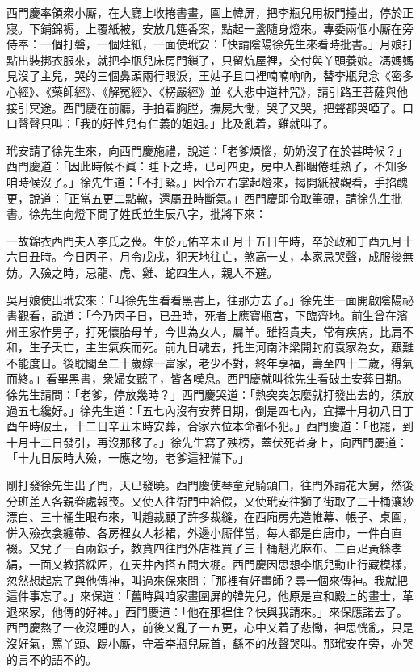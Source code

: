 西門慶率領衆小厮，在大廳上收捲書畫，圍上幃屏，把李瓶兒用板門擡出，停於正寢。下鋪錦褥，上覆紙被，安放几筵香案，點起一盞隨身燈來。專委兩個小厮在旁侍奉：一個打磐，一個炷紙，一面使玳安：「快請陰陽徐先生來看時批書。」月娘打點出裝挷衣服來，就把李瓶兒床房門鎖了，只留炕屋裡，交付與丫頭養娘。馮媽媽見沒了主兒，哭的三個鼻頭兩行眼淚，王姑子且口裡喃喃吶吶，{}替李瓶兒念《密多心經》、《藥師經》、《解冤經》、《楞嚴經》並《大悲中道神咒》，請引路王菩薩與他接引冥途。西門慶在前廳，手拍着胸膛，撫屍大慟，哭了又哭，把聲都哭啞了。口口聲聲只叫：「我的好性兒有仁義的姐姐。」比及亂着，雞就叫了。

玳安請了徐先生來，向西門慶施禮，說道：「老爹煩惱，奶奶沒了在於甚時候？」西門慶道：「因此時候不眞：睡下之時，已可四更，房中人都睏倦睡熟了，不知多咱時候沒了。」徐先生道：「不打緊。」因令左右掌起燈來，揭開紙被觀看，手掐醜更，說道：「正當五更二點轍，還屬丑時斷氣。」西門慶即令取筆硯，請徐先生批書。徐先生向燈下問了姓氏並生辰八字，批將下來：

\begin{myquote}[\markfont]
一故錦衣西門夫人李氏之䘮。生於元佑辛未正月十五日午時，卒於政和丁酉九月十六日丑時。今日丙子，月令戊戌，犯天地往亡，煞高一丈，本家忌哭聲，成服後無妨。入殮之時，忌龍、虎、雞、蛇四生人，親人不避。
\end{myquote}

吳月娘使出玳安來：「叫徐先生看看黑書上，往那方去了。」徐先生一面開啟陰陽祕書觀看，說道：「今乃丙子日，已丑時，死者上應寶瓶宮，下臨齊地。前生曾在濱州王家作男子，打死懷胎母羊，今世為女人，屬羊。雖招貴夫，常有疾病，比肩不和，生子夭亡，主生氣疾而死。前九日魂去，托生河南汴梁開封府袁家為女，艱難不能度日。後耽閣至二十歲嫁一富家，老少不對，終年享福，壽至四十二歲，得氣而終。」{}看畢黑書，衆婦女聽了，皆各嘆息。西門慶就叫徐先生看破土安葬日期。徐先生請問：「老爹，停放幾時？」西門慶哭道：「熱突突怎麼就打發出去的，須放過五七纔好。」徐先生道：「五七內沒有安葬日期，倒是四七內，宜擇十月初八日丁酉午時破土，十二日辛丑未時安葬，合家六位本命都不犯。」西門慶道：「也罷，到十月十二日發引，再沒那移了。」徐先生寫了殃榜，蓋伏死者身上，向西門慶道：「十九日辰時大殮，一應之物，老爹這裡備下。」

剛打發徐先生出了門，天已發曉。西門慶使琴童兒騎頭口，往門外請花大舅，然後分班差人各親眷處報䘮。又使人往衙門中給假，又使玳安往獅子街取了二十桶瀼紗漂白、三十桶生眼布來，叫趙裁顧了許多裁縫，在西廂房先造帷幕、帳子、桌圍，併入殮衣衾纏帶、各房裡女人衫裙，外邊小厮伴當，每人都是白唐巾，一件白直裰。又兌了一百兩銀子，教賁四往門外店裡買了三十桶魁光麻布、二百疋黃絲孝絹，一面又教搭綵匠，在天井內搭五間大棚。西門慶因思想李瓶兒動止行藏模樣，忽然想起忘了與他傳神，叫過來保來問：「那裡有好畫師？尋一個來傳神。我就把這件事忘了。」來保道：「舊時與咱家畫圍屏的韓先兒，他原是宣和殿上的畫士，革退來家，他傳的好神。」西門慶道：「他在那裡住？快與我請來。」來保應諾去了。西門慶熬了一夜沒睡的人，前後又亂了一五更，心中又着了悲慟，神思恍亂，只是沒好氣，罵丫頭、踢小厮，守着李瓶兒屍首，繇不的放聲哭叫。那玳安在旁，亦哭的言不的語不的。{}{}

